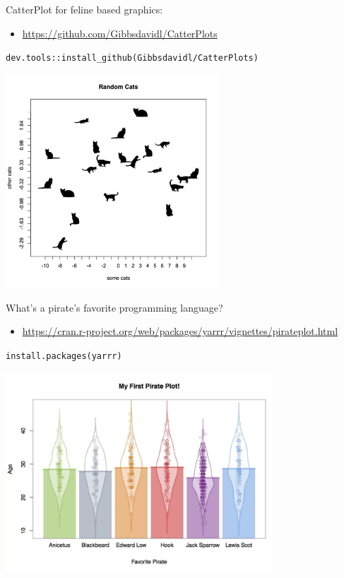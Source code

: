 \documentclass[
  ignorenonframetext,
]{beamer}
\providecommand{\tightlist}{%
  \setlength{\itemsep}{0pt}\setlength{\parskip}{0pt}}
\begin{document}
\begin{frame}[fragile]{CatterPlot for feline based graphics:}
\protect\hypertarget{catterplot-for-feline-based-graphics}{}

\begin{itemize}
\tightlist
\item
  \url{https://github.com/Gibbsdavidl/CatterPlots}
\end{itemize}

\texttt{dev.tools::install\_github(Gibbsdavidl/CatterPlots)}

\includegraphics[width=0.6\textwidth,height=\textheight]{../external/images/funR_1_catterplotter.png}

\end{frame}

\begin{frame}[fragile]{What's a pirate's favorite programming language?}
\protect\hypertarget{whats-a-pirates-favorite-programming-language}{}

\begin{itemize}
\tightlist
\item
  \url{https://cran.r-project.org/web/packages/yarrr/vignettes/pirateplot.html}
\end{itemize}

\texttt{install.packages(\textquotesingle{}yarrr\textquotesingle{})}

\includegraphics[width=0.75\textwidth,height=\textheight]{../external/images/funR_2_pirate.png}

\end{frame}
\end{document}
